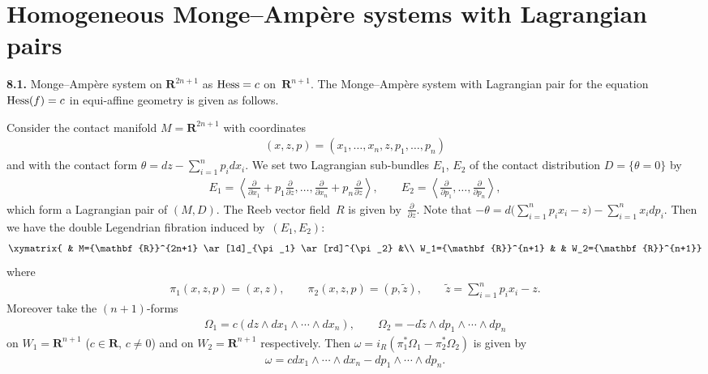 \section{Homogeneous Monge--Amp{\`e}re systems with Lagrangian pairs}
\label{Homogeneous M-A systems with Lagrangian pairs.}

{\bf 8.1.}
Monge--Amp{\`e}re system on ${\mathbf{R}}^{2n+1}$ as
${\rm Hess} = c$ on~${\mathbf{R}}^{n+1}$.
The Monge--Amp{\`e}re system with Lagrangian pair
for the equation ${\rm Hess}(f)= c$
in equi-af\/f\/ine geometry is given as follows.

Consider the contact manifold
$M = {\mathbf{R}}^{2n+1}$ with coordinates
\begin{gather*}
(x, z, p) = (x_1, \dots, x_n, z, p_1, \dots, p_n)
\end{gather*}
and with the contact form
$\theta = dz - \sum\limits_{i=1}^n p_idx_i$.
We set two Lagrangian sub-bundles $E_1$, $E_2$
of the contact distribution $D=\{ \theta =0 \}$ by
\begin{gather*}
E_1  =
\left\langle \frac{\partial}{\partial x_1}+p_1\frac{\partial}{\partial z},
\dots,\frac{\partial}{\partial x_n}+p_n\frac{\partial}{\partial z}\right\rangle,
\qquad
E_2 =
\left\langle \frac{\partial}{\partial p_1},\dots,\frac{\partial}{\partial p_n}
\right\rangle,
\end{gather*}
which form a Lagrangian pair of $(M, D)$.
The Reeb vector f\/ield~$R$ is given by~$\frac{\partial}{\partial z}$.
Note that
$
- \theta = d\Big(\sum\limits_{i=1}^n p_ix_i - z\Big) - \sum\limits_{i=1}^n x_idp_i.
$
Then we have the double Legendrian f\/ibration induced by~$(E_1,E_2)$:
\begin{gather*}
\xymatrix{
& M={\mathbf{R}}^{2n+1} \ar[ld]_{\pi_1} \ar[rd]^{\pi_2}  &\\
W_1={\mathbf{R}}^{n+1} &  & W_2={\mathbf{R}}^{n+1}}
\end{gather*}
where
\begin{gather*}
\pi_1(x, z, p) = (x, z), \qquad
\pi_2(x, z, p) =
(p, \tilde{z}), \qquad \tilde{z} = \sum_{i=1}^n p_ix_i - z.
\end{gather*}
Moreover take the
$(n+1)$-forms
\begin{gather*}
\Omega_1
= c(dz \wedge dx_1\wedge \cdots \wedge dx_{n}),\qquad
\Omega_2
= - d\tilde{z} \wedge dp_1\wedge \cdots \wedge dp_{n}
\end{gather*}
on $W_1 = {\mathbf{R}}^{n+1}$
($c\in {\mathbf{R}}$, $c\not= 0$)
and
on $W_2 = {\mathbf{R}}^{n+1}$ respectively.
Then $\omega = i_R (\pi_1^*\Omega_1 - \pi_2^*\Omega_2)$
is given by
\begin{gather*}
\omega = c dx_1\wedge \cdots \wedge dx_{n} -
dp_1\wedge \cdots \wedge dp_{n}.
\end{gather*}

